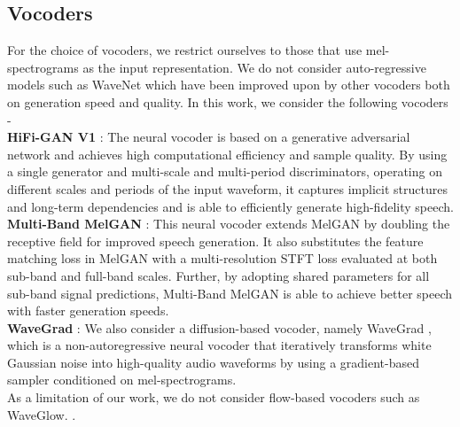 \documentclass{article}
\begin{document}
\subsection{Vocoders}
\label{subsec:vocoders}
For the choice of vocoders, we restrict ourselves to those that use mel-spectrograms as the input representation. 
We do not consider auto-regressive models such as WaveNet \cite{oord2016wavenet} which have been improved upon by other vocoders both on generation speed and quality. In this work, we consider the following vocoders - \\
\textbf{HiFi-GAN V1} \cite{kong2020hifi}: The neural vocoder is based on a generative adversarial network and achieves high computational efficiency and sample quality. By using a single generator and multi-scale and multi-period discriminators, operating on different scales and periods of the input waveform, it captures implicit structures and long-term dependencies and is able to efficiently generate high-fidelity speech. \\
\textbf{Multi-Band MelGAN} \cite{yang2021multi}: This neural vocoder extends MelGAN \cite{kumar2019melgan} by doubling the receptive field for improved speech generation. It also substitutes the feature matching loss in MelGAN \cite{kumar2019melgan} with a multi-resolution STFT loss evaluated at both sub-band and full-band scales. Further, by adopting shared parameters for all sub-band signal predictions, Multi-Band MelGAN is able to achieve better speech with faster generation speeds.\\
\textbf{WaveGrad} \cite{chen2020wavegrad}: We also consider a diffusion-based vocoder, namely WaveGrad \cite{chen2020wavegrad}, which is a non-autoregressive neural vocoder that iteratively transforms white Gaussian noise into high-quality audio waveforms by using a gradient-based sampler conditioned on mel-spectrograms. \\
As a limitation of our work, we do not consider flow-based vocoders such as WaveGlow. \cite{prenger2019waveglow}.
\end{document}
